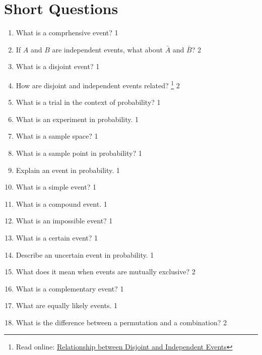 \documentclass[a4paper,oneside]{book}
\begin{document}
\section{Short Questions}
 \begin{enumerate}
 
 \item What is a comprhensive event? \hfill 1
 \item If $A$ and $B$ are independent events, what about $\bar A$ and $\bar B$? \hfill 2
    \item
	What is a disjoint event? \hfill 1
    \item
	How are disjoint and independent events related? \footnote{Read online: \href{https://study.statmania.info/disjint-independent-relation.sm}{Relationship between Disjoint and Independent Events}}  \hfill 2

 
    \item What is a trial in the context of probability? \hfill 1

\item What is an experiment in probability. \hfill 1

\item What is a sample space? \hfill 1

\item What is a sample point in probability? \hfill 1

\item Explain an event in probability. \hfill 1

\item What is a simple event? \hfill 1

\item What is a compound event. \hfill 1

\item What is an impossible event? \hfill 1

\item What is a certain event? \hfill 1

\item Describe an uncertain event in probability. \hfill 1

\item What does it mean when events are mutually exclusive? \hfill 2

\item What is a complementary event? \hfill 1

\item What are equally likely events. \hfill 1

\item What is the difference between a permutation and a combination? \hfill 2


\end{enumerate}
\end{document}
